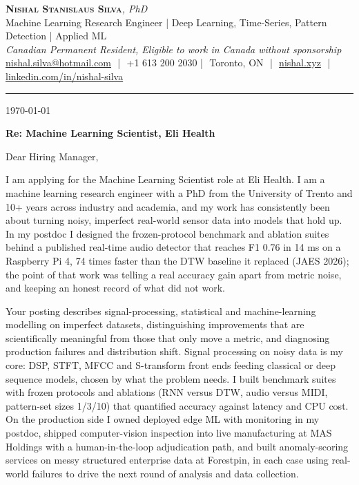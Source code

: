 \documentclass[11pt]{article}
\makeatletter
\newcommand{\clName}{Nishal Stanislaus Silva}
\newcommand{\clEmail}{nishal.silva@hotmail.com}
\newcommand{\clPhone}{+1 613 200 2030}
\newcommand{\clCity}{Toronto, ON}
\newcommand{\clSite}{https://nishal.xyz}
\newcommand{\clLinkedIn}{https://www.linkedin.com/in/nishal-silva}
\newcommand{\clStatus}{Canadian Permanent Resident, Eligible to work in Canada without sponsorship}
\newcommand{\clTagline}{Machine Learning Research Engineer | Deep Learning, Time-Series, Pattern Detection | Applied ML}
\newcommand{\clRole}{Machine Learning Scientist}
\newcommand{\clCompany}{Eli Health}
\newcommand{\clAddressee}{Dear Hiring Manager,}
\makeatother
\begin{document}
\pagestyle{empty}
\begin{center}
    {\LARGE \scshape \textbf{\clName}}{\large \textit{, PhD}}\\[1pt]
    {\small \clTagline}\\[1pt]
    {\footnotesize\textit{\clStatus}}\\[1pt]
    {\small
    \href{mailto:\clEmail}{\clEmail} \,\,|\,\, \clPhone \,\,|\,\, \clCity
    \,\,|\,\, \href{\clSite}{nishal.xyz} \,\,|\,\, \href{\clLinkedIn}{linkedin.com/in/nishal-silva}}
\end{center}

\rule{\linewidth}{0.4pt}\vspace{0.6em}

\today

\textbf{Re: \clRole{}, \clCompany{}}

\clAddressee

I am applying for the Machine Learning Scientist role at Eli Health. I am a machine learning research engineer with a PhD from the University of Trento and 10+ years across industry and academia, and my work has consistently been about turning noisy, imperfect real-world sensor data into models that hold up. In my postdoc I designed the frozen-protocol benchmark and ablation suites behind a published real-time audio detector that reaches F1 0.76 in 14 ms on a Raspberry Pi 4, 74 times faster than the DTW baseline it replaced (JAES 2026); the point of that work was telling a real accuracy gain apart from metric noise, and keeping an honest record of what did not work.

Your posting describes signal-processing, statistical and machine-learning modelling on imperfect datasets, distinguishing improvements that are scientifically meaningful from those that only move a metric, and diagnosing production failures and distribution shift. Signal processing on noisy data is my core: DSP, STFT, MFCC and S-transform front ends feeding classical or deep sequence models, chosen by what the problem needs. I built benchmark suites with frozen protocols and ablations (RNN versus DTW, audio versus MIDI, pattern-set sizes 1/3/10) that quantified accuracy against latency and CPU cost. On the production side I owned deployed edge ML with monitoring in my postdoc, shipped computer-vision inspection into live manufacturing at MAS Holdings with a human-in-the-loop adjudication path, and built anomaly-scoring services on messy structured enterprise data at Forestpin, in each case using real-world failures to drive the next round of analysis and data collection.
\end{document}
